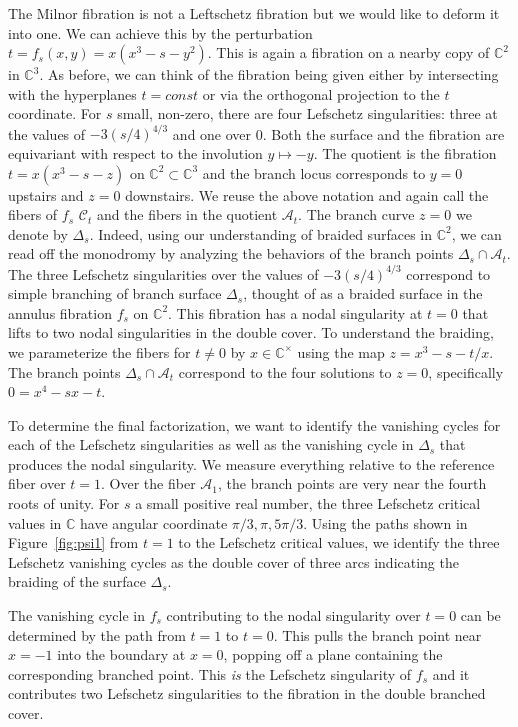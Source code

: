 \documentclass[11pt,letterpaper,reqno]{amsart}
\theoremstyle{remark}
\newcommand{\CC}{{\mathbb C}}
\def \A {\mathcal{A}}
\begin{document}
The Milnor fibration is not a Leftschetz fibration but we would like to deform it into one. We can achieve this by the perturbation $t = f_s(x,y) = x(x^3 -s - y^2)$. This is again a fibration on a nearby copy of $\CC^2$ in $\CC^3$. As before, we can think of the fibration being given either by intersecting with the hyperplanes $t = const$ or via the orthogonal projection to the $t$ coordinate. For $s$ small, non-zero, there are four Lefschetz singularities: three at the values of $-3(s/4)^{4/3}$ and one over 0. Both the surface and the fibration are equivariant with respect to the involution $y\mapsto -y$. The quotient is the fibration $t = x(x^3 -s - z)$ on $\CC^2 \subset \CC^3$ and the branch locus corresponds to $y=0$ upstairs and $z=0$ downstairs. We reuse the above notation and again call the fibers of $f_s$ $\mathcal{C}_t$ and the fibers in the quotient $\A_t$. The branch curve $z=0$ we denote by $\Delta_s$. Indeed, using our understanding of braided surfaces in $\CC^2$, we can read off the monodromy by analyzing the behaviors of the branch points $\Delta_s \cap \mathcal{A}_t$. The three Lefschetz singularities over the values of $-3(s/4)^{4/3}$ correspond to simple branching of branch surface $\Delta_s$, thought of as a braided surface in the annulus fibration $f_s$ on $\CC^2$. This fibration has a nodal singularity at $t=0$ that lifts to two nodal singularities in the double cover. To understand the braiding, we parameterize the fibers for $t\neq0$ by 
$x \in \CC^\times$ using the map $z = x^3 - s -t/x$. The branch points $\Delta_s \cap \mathcal{A}_t$ correspond to the four solutions to $z=0$, specifically $0 = x^4 - sx - t$.

To determine the final factorization, we want to identify the vanishing cycles for each of the Lefschetz singularities as well as the vanishing cycle in $\Delta_s$ that produces the nodal singularity. We measure everything relative to the reference fiber over $t=1$. Over the fiber $\A_1$, the branch points are very near the fourth roots of unity. For $s$ a small positive real number, the three Lefschetz critical values in $\CC$ have angular coordinate $\pi/3, \pi, 5\pi/3$. Using the paths shown in Figure~\ref{fig:psi1} from $t=1$ to the Lefschetz critical values, we identify the three Lefschetz vanishing cycles as the double cover of three arcs indicating the braiding of the surface $\Delta_s$.

The vanishing cycle in $f_s$ contributing to the nodal singularity over $t=0$ can be determined by the path from $t=1$ to $t=0$. This pulls the branch point near $x = -1$ into the boundary at $x=0$, popping off a plane containing the corresponding branched point. This \emph{is} the Lefschetz singularity of $f_s$ and it contributes two Lefschetz singularities to the fibration in the double branched cover.
\end{document}
